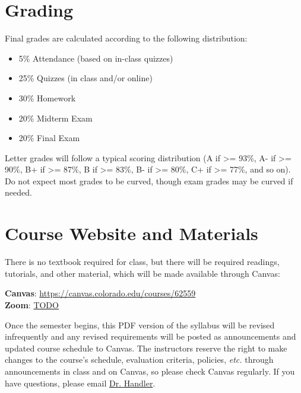 \documentclass[10pt]{memoir}
\makeatletter
\def\myzoomurl{TODO}
\def\mycanvasurl{https://canvas.colorado.edu/courses/62559}
\def\instructorAlastname{Handler}
\def\instructorAemail{abram.handler@colorado.edu}
\makeatother
\begin{document}
\section{\textbf{Grading}}

Final grades are calculated according to the following distribution:
\begin{itemize}
\item 5\% Attendance (based on in-class quizzes)
\item 25\% Quizzes (in class and/or online)
\item 30\% Homework
\item 20\% Midterm Exam
\item 20\% Final Exam
\end{itemize}

Letter grades will follow a typical scoring distribution (A if >= 93\%, A- if >= 90\%, B+ if >=
87\%, B if >= 83\%, B- if >= 80\%, C+ if >= 77\%, and so on). Do not expect most grades to be
curved, though exam grades may be curved if needed.


\section{\textbf{Course Website and Materials}}
There is no textbook required for class, but there will be required readings, tutorials, and other material, which will be made available through Canvas:
\vspace{-8pt}
    \begin{center}
    \Large{\textbf{Canvas}: \href{\mycanvasurl}{\mycanvasurl}}\\
    \Large{\textbf{Zoom}: \href{\myzoomurl}{\myzoomurl}}
    \end{center}
\vspace{-8pt}
Once the semester begins, this PDF version of the syllabus will be revised infrequently and any revised requirements will be posted as announcements and updated course schedule to Canvas. The instructors reserve the right to make changes to the course's schedule, evaluation criteria, policies, \textit{etc.} through announcements in class and on Canvas, so please check Canvas regularly. If you have questions, please email \href{mailto:\instructorAemail}{Dr. \instructorAlastname}.
\end{document}
